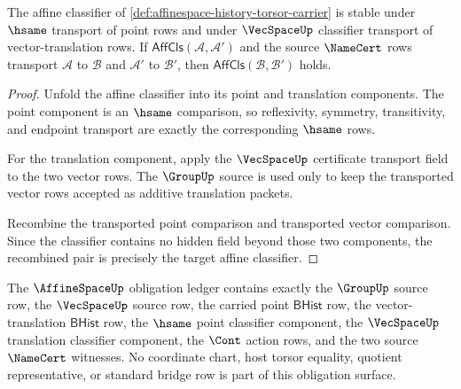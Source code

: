 \begin{theorem}
\label{thm:affinespace-classifier-transport}
The affine classifier of \autoref{def:affinespace-history-torsor-carrier} is stable under $\hsame$ transport of point rows and under $\VecSpaceUp$ classifier transport of vector-translation rows. If $\mathsf{AffCls}(\mathcal{A},\mathcal{A}')$ and the source $\NameCert$ rows transport $\mathcal{A}$ to $\mathcal{B}$ and $\mathcal{A}'$ to $\mathcal{B}'$, then $\mathsf{AffCls}(\mathcal{B},\mathcal{B}')$ holds.
\end{theorem}
\begin{proof}
Unfold the affine classifier into its point and translation components. The point component is an $\hsame$ comparison, so reflexivity, symmetry, transitivity, and endpoint transport are exactly the corresponding $\hsame$ rows.

For the translation component, apply the $\VecSpaceUp$ certificate transport field to the two vector rows. The $\GroupUp$ source is used only to keep the transported vector rows accepted as additive translation packets.

Recombine the transported point comparison and transported vector comparison. Since the classifier contains no hidden field beyond those two components, the recombined pair is precisely the target affine classifier.
\end{proof}
\begin{theorem}
\label{thm:affinespace-ledger-exactness}
The $\AffineSpaceUp$ obligation ledger contains exactly the $\GroupUp$ source row, the $\VecSpaceUp$ source row, the carried point $\mathsf{BHist}$ row, the vector-translation $\mathsf{BHist}$ row, the $\hsame$ point classifier component, the $\VecSpaceUp$ translation classifier component, the $\Cont$ action rows, and the two source $\NameCert$ witnesses. No coordinate chart, host torsor equality, quotient representative, or standard bridge row is part of this obligation surface.
\end{theorem}
